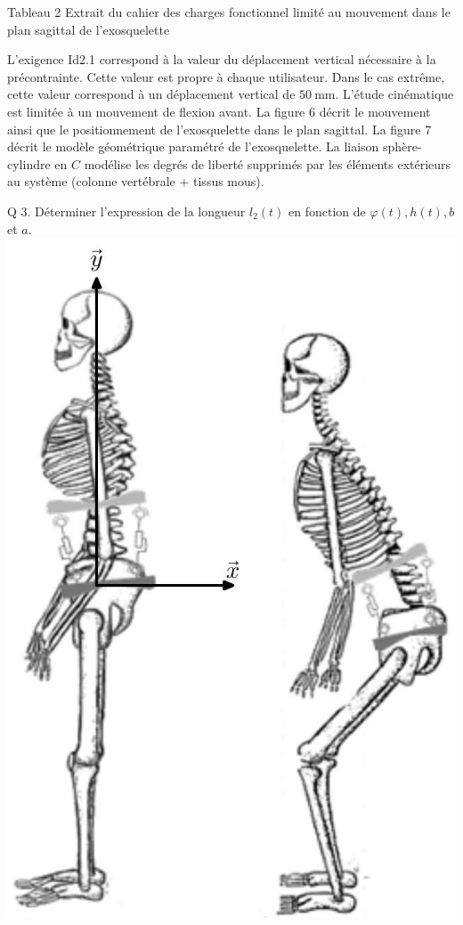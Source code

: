 \documentclass[10pt]{article}
\begin{document}
Tableau 2 Extrait du cahier des charges fonctionnel limité au mouvement dans le plan sagittal de l'exosquelette

L'exigence Id2.1 correspond à la valeur du déplacement vertical nécessaire à la précontrainte. Cette valeur est propre à chaque utilisateur. Dans le cas extrême, cette valeur correspond à un déplacement vertical de $50 \mathrm{~mm}$. L'étude cinématique est limitée à un mouvement de flexion avant. La figure 6 décrit le mouvement ainsi que le positionnement de l'exosquelette dans le plan sagittal. La figure 7 décrit le modèle géométrique paramétré de l'exosquelette. La liaison sphère-cylindre en $C$ modélise les degrés de liberté supprimés par les éléments extérieurs au système (colonne vertébrale + tissus mous).

Q 3. Déterminer l'expression de la longueur $l_{2}(t)$ en fonction de $\varphi(t), h(t), b$ et $a$.\\
\includegraphics[max width=\textwidth, center]{2024_03_20_0c3cf888f6e04b1986bcg-05}
\end{document}
